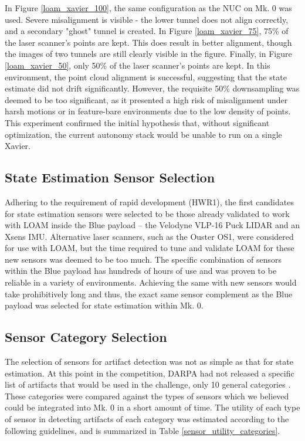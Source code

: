 In Figure \ref{loam_xavier_100}, the same configuration as the NUC on Mk. 0 was used. Severe misalignment is visible - the lower tunnel does not align correctly, and a secondary "ghost" tunnel is created. In Figure \ref{loam_xavier_75}, 75\% of the laser scanner's points are kept. This does result in better alignment, though the images of two tunnels are still clearly visible in the figure. Finally, in Figure \ref{loam_xavier_50}, only 50\% of the laser scanner's points are kept. In this environment, the point cloud alignment is successful, suggesting that the state estimate did not drift significantly. However, the requisite 50\% downsampling was deemed to be too significant, as it presented a high risk of misalignment under harsh motions or in feature-bare environments due to the low density of points. This experiment confirmed the initial hypothesis that, without significant optimization, the current autonomy stack would be unable to run on a single Xavier.

\subsection{State Estimation Sensor Selection}

Adhering to the requirement of rapid development (HWR1), the first candidates for state estimation sensors were selected to be those already validated to work with LOAM inside the Blue payload -- the Velodyne VLP-16 Puck LIDAR and an Xsens IMU. Alternative laser scanners, such as the Ouster OS1, were considered for use with LOAM, but the time required to tune and validate LOAM for these new sensors was deemed to be too much. The specific combination of sensors within the Blue payload has hundreds of hours of use and was proven to be reliable in a variety of environments. Achieving the same with new sensors would take prohibitively long and thus, the exact same sensor complement as the Blue payload was selected for state estimation within Mk. 0.

\subsection{Sensor Category Selection}

The selection of sensors for artifact detection was not as simple as that for state estimation. At this point in the competition, DARPA had not released a specific list of artifacts that would be used in the challenge, only 10 general categories \cite{tunnel_rules}. These categories were compared against the types of sensors which we believed could be integrated into Mk. 0 in a short amount of time. The utility of each type of sensor in detecting artifacts of each category was estimated according to the following guidelines, and is summarized in Table \ref{sensor_utility_categories}.

